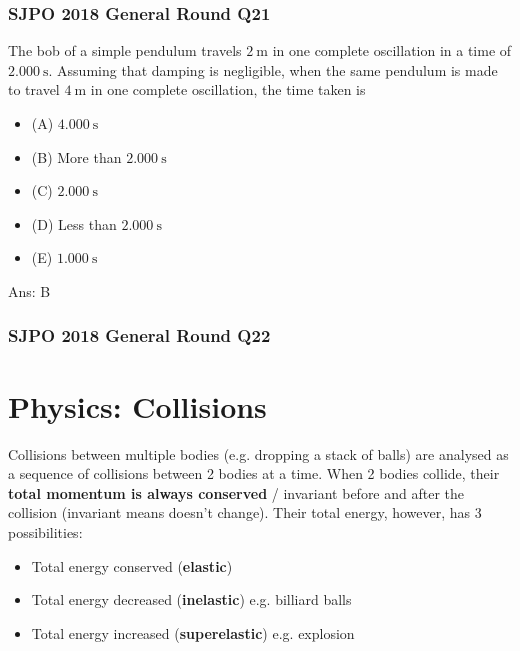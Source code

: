 \documentclass{article}
\begin{document}
\begin{samepage}
\subsubsection{SJPO 2018 General Round Q21}
The bob of a simple pendulum travels $2 \mathrm{~m}$ in one complete oscillation in a time of $2.000 \mathrm{~s}$. Assuming that damping is negligible, when the same pendulum is made to travel $4 \mathrm{~m}$ in one complete oscillation, the time taken is
\begin{itemize}
\item[](A) $4.000 \mathrm{~s}$
\item[](B) More than $2.000 \mathrm{~s}$
\item[](C) $2.000 \mathrm{~s}$
\item[](D) Less than $2.000 \mathrm{~s}$
\item[](E) $1.000 \mathrm{~s}$
\end{itemize}
Ans: \ifpaper B \fi 
\end{samepage}
\begin{samepage}
\subsubsection{SJPO 2018 General Round Q22}

\end{samepage}
\section{Physics: Collisions}
Collisions between multiple bodies (e.g. dropping a stack of balls) are analysed as a sequence of collisions between 2 bodies at a time. When 2 bodies collide, their \textbf{total momentum is always conserved} / invariant before and after the collision (invariant means doesn't change). Their total energy, however, has 3 possibilities:
\begin{itemize}
    \item Total energy conserved (\textbf{elastic})
    \item Total energy decreased (\textbf{inelastic}) e.g. billiard balls
    \item Total energy increased (\textbf{superelastic}) e.g. explosion
\end{itemize}
\end{document}
